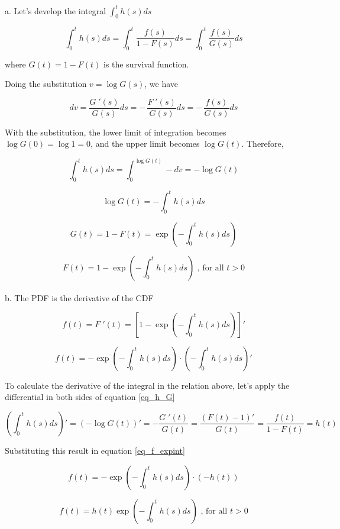 a. Let's develop the integral $\int_0^t h(s) ds$

$$
\int_0^t h(s) ds = \int_0^t \frac{f(s)}{1 - F(s)} ds = \int_0^t \frac{f(s)}{G(s)} ds
$$

\noindent where $G(t) = 1 - F(t)$ is the survival function.


Doing the substitution $v = \log G(s)$, we have

$$
dv = \frac{G\;\!'(s)}{G(s)} ds = -\, \frac{F\;\!'(s)}{G(s)} ds = -\, \frac{f(s)}{G(s)} ds
$$


With the substitution, the lower limit of integration becomes $\log G(0) = \log 1 = 0$, and the upper limit becomes $\log G(t)$.
Therefore,

\begin{equation} \label{eq_h_G}
\int_0^t h(s) ds = \int_0^{\log G(t)} - dv = -\log G(t)
\end{equation}


$$
\log G(t) = - \int_0^t h(s) ds
$$

$$
G(t) = 1 - F(t) = \exp \left( - \int_0^t h(s) ds \right)
$$

$$
F(t) = 1 - \exp \left( - \int_0^t h(s) ds \right) \text{ , for all } t>0
$$ \\


b. The PDF is the derivative of the CDF

$$
f(t) = F\;\!'(t) = \left[ 1 - \exp \left( - \int_0^t h(s) ds \right) \right]'
$$

\begin{equation} \label{eq_f_expint}
f(t) = - \exp \left( - \int_0^t h(s) ds \right) \cdot \left( - \int_0^t h(s) ds \right)'
\end{equation}

To calculate the derivative of the integral in the relation above, let's apply the differential in both sides of equation \eqref{eq_h_G}

$$
\left( \int_0^t h(s) ds \right)'
=
\left( - \log G(t) \right)'
=
- \frac{G\;\!'(t)}{G(t)}
=
\frac{ (F(t)-1)' }{G(t)}
=
\frac{f(t)}{1 - F(t)}
=
h(t)
$$

Substituting this result in equation \eqref{eq_f_expint}

$$
f(t) = - \exp \left( - \int_0^t h(s) ds \right) \cdot (-h(t))
$$

$$
f(t) = h(t) \exp \left( - \int_0^t h(s) ds \right) \text{ , for all } t>0
$$
